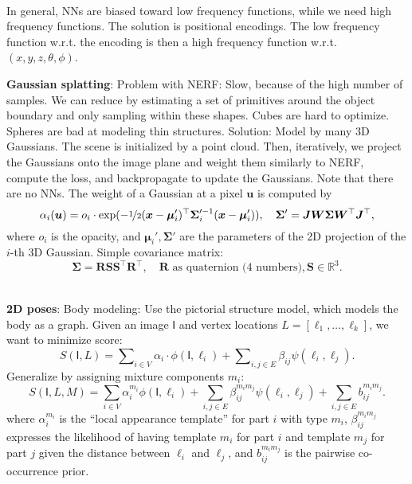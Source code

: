\documentclass{article}
\newcommand{\R}{\mathbb{R}}
\renewcommand{\vec}[1]{\bm{#1}}
\newcommand{\mat}[1]{\bm{#1}}
\newcommand{\tens}[1]{\bm{\mathsf{#1}}}
\newenvironment{topic}[1]
{\textbf{\sffamily \colorbox{black}{\rlap{\textbf{\textcolor{white}{#1}}}\hspace{\linewidth}\hspace{-2\fboxsep}}} \\ \vspace{0.2cm}}
{}
\begin{document}
\begin{multicols*}{2}
\begin{topic}{Implicit surfaces and neural radiance fields}
        In general, NNs are biased toward low frequency functions, while we need high frequency functions.
        The solution is positional encodings. The low frequency function w.r.t. the encoding is then a high
        frequency function w.r.t. $(x,y,z,\theta,\phi)$.

        \textbf{Gaussian splatting}: Problem with NERF: Slow, because of the high number of samples.
        We can reduce by estimating a set of primitives around the object boundary and only sampling
        within these shapes. Cubes are hard to optimize. Spheres are bad at modeling thin structures.
        Solution: Model by many 3D Gaussians. The scene is initialized by a point cloud. Then,
        iteratively, we project the Gaussians onto the image plane and weight them similarly to NERF,
        compute the loss, and backpropagate to update the Gaussians. Note that there are no
        NNs. The weight of a Gaussian at a pixel $\vec{u}$ is computed by \[
            \alpha_i(\vec{u}) = o_i \cdot \exp ( -\nicefrac{1}{2} (\vec{x} - \vec{\mu}_i')^\top \mat{\Sigma}_i'^{-1} (\vec{x} - \vec{\mu}_i')), \quad \mat{\Sigma}' = \mat{J} \mat{W} \mat{\Sigma} \mat{W}^\top \mat{J}^\top,
        \]
        where $o_i$ is the opacity, and $\vec{\mu}_i', \mat{\Sigma}'$ are the parameters of the 2D
        projection of the $i$-th 3D Gaussian. Simple covariance matrix: \[
            \mat{\Sigma} = \mat{R} \mat{S} \mat{S}^\top \mat{R}^\top, \quad \mat{R} \text{ as quaternion (4 numbers)}, \mat{S} \in \R^3.
        \]

    \end{topic}

    \begin{topic}{Parametric human body models}
        \textbf{2D poses}: Body modeling: Use the pictorial structure model, which models the body
        as a graph. Given an image $\tens{I}$ and vertex locations $L = [\ell_1, \ldots, \ell_k]$, we want
        to minimize score: \[
            S(\tens{I}, L) = \sum\nolimits_{i\in V} \alpha_i \cdot \phi(\tens{I}, \ell_i) + \sum\nolimits_{i,j \in E} \beta_{ij} \psi(\ell_i, \ell_j).
        \]
        Generalize by assigning mixture components $m_i$: \[
            S(\tens{I}, L, M) = \sum_{i\in V} \alpha_i^{m_i} \phi(\tens{I}, \ell_i) + \sum_{i,j \in E} \beta_{ij}^{m_im_j} \psi(\ell_i,\ell_j) + \sum_{i,j \in E} b_{ij}^{m_im_j}.
        \]
        where $\alpha^{m_i}_i$ is the ``local appearance template'' for part $i$ with type $m_i$,
        $\beta^{m_im_j}_{ij}$ expresses the likelihood of having template $m_i$ for part $i$ and template
        $m_j$ for part $j$ given the distance between $\ell_i$ and $\ell_j$, and $b_{ij}^{m_im_j}$ is the
        pairwise co-occurrence prior.


\end{topic}
\end{multicols*}
\end{document}

